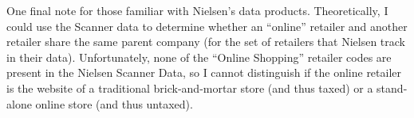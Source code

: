 \documentclass[AEJ,reviewmode]{AEA}
\begin{document}
One final note for those familiar with Nielsen's data products. Theoretically, I could use the Scanner data to determine whether an ``online'' retailer and another retailer share the same parent company (for the set of retailers that Nielsen track in their data). Unfortunately, none of the ``Online Shopping'' retailer codes are present in the Nielsen Scanner Data, so I cannot distinguish if the online retailer is the website of a traditional brick-and-mortar store (and thus taxed) or a stand-alone online store (and thus untaxed).
\end{document}
